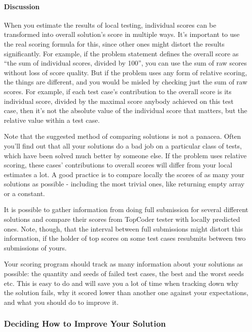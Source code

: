 \documentclass[]{article}
\let\oldparagraph\paragraph
\renewcommand{\paragraph}[1]{\oldparagraph{#1}\mbox{}}
\begin{document}
\hypertarget{discussion-2}{%
\paragraph{Discussion}\label{discussion-2}}

When you estimate the results of local testing, individual scores can be
transformed into overall solution's score in multiple ways. It's
important to use the real scoring formula for this, since other ones
might distort the results significantly. For example, if the problem
statement defines the overall score as ``the sum of individual scores,
divided by 100'', you can use the sum of raw scores without loss of
score quality. But if the problem uses any form of relative scoring, the
things are different, and you would be misled by checking just the sum
of raw scores. For example, if each test case's contribution to the
overall score is its individual score, divided by the maximal score
anybody achieved on this test case, then it's not the absolute value of
the individual score that matters, but the relative value within a test
case.

Note that the suggested method of comparing solutions is not a panacea.
Often you'll find out that all your solutions do a bad job on a
particular class of tests, which have been solved much better by someone
else. If the problem uses relative scoring, these cases' contributions
to overall scores will differ from your local estimates a lot. A good
practice is to compare locally the scores of as many your solutions as
possible - including the most trivial ones, like returning empty array
or a constant.

It is possible to gather information from doing full submission for
several different solutions and compare their scores from TopCoder
tester with locally predicted ones. Note, though, that the interval
between full submissions might distort this information, if the holder
of top scores on some test cases resubmits between two submissions of
yours.

Your scoring program should track as many information about your
solutions as possible: the quantity and seeds of failed test cases, the
best and the worst seeds etc. This is easy to do and will save you a lot
of time when tracking down why the solution fails, why it scored lower
than another one against your expectations, and what you should do to
improve it.

\hypertarget{deciding-how-to-improve-your-solution}{%
\subsubsection{Deciding How to Improve Your
Solution}\label{deciding-how-to-improve-your-solution}}
\end{document}
